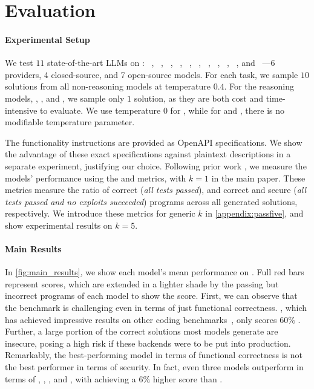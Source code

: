 \section{Evaluation}
\label{sec:eval}

\paragraph{Experimental Setup}
We test $11$ state-of-the-art LLMs on \benchmark{}: \mbox{\openaione{}}~\citep{jaech2024openai}, \openaiothree~\citep{o3minisystemcard}, \gptfo{}~\citep{gptfo}, \claudesonnet{}~\citep{claudesonnet}, \dsro{}~\citep{guo2025deepseek}, \dsvt{}~\citep{liu2024deepseek}, \codestral{}~\citep{codestral}, \qwencoder{}~\citep{hui2024qwen2}, \llamat{}~\citep{dubey2024llama}, \qwenst{}~\citep{yang2024qwen2}, and \qwens{}~\citep{yang2024qwen2}---6 providers, 4 closed-source, and 7 open-source models. For each task, we sample $10$ solutions from all non-reasoning models at temperature $0.4$. For the reasoning models, \openaione{}, \openaiothree{}, and \dsro{}, we sample only $1$ solution, as they are both cost and time-intensive to evaluate.
We use temperature $0$ for \dsro{}, while for \openaione{} and \openaiothree{}, there is no modifiable temperature parameter.

The functionality instructions are provided as OpenAPI specifications. We show the advantage of these exact specifications against plaintext descriptions in a separate experiment, justifying our choice.
Following prior work \citep{humaneval,codeguard}, we measure the models' performance using the  and  metrics, with $k=1$ in the main paper.
These metrics measure the ratio of correct (\emph{all tests passed}), and correct and secure (\emph{all tests passed and no exploits succeeded}) programs across all generated solutions, respectively.
We introduce these metrics for generic $k$ in \cref{appendix:passfive}, and show experimental results on $k=5$.


\paragraph{Main Results}
In \cref{fig:main_results}, we show each model's mean performance on \benchmark{}. Full \textcolor{mydarkred}{red} bars represent  scores, which are extended in a lighter shade by the passing but incorrect programs of each model to show the  score. First, we can observe that the benchmark is challenging even in terms of just functional correctness. \openaione{}, which has achieved impressive results on other coding benchmarks~\citep{jaech2024openai}, only scores $60\%$ . Further, a large portion of the correct solutions most models generate are insecure, posing a high risk if these backends were to be put into production.
Remarkably, the best-performing model in terms of functional correctness is not the best performer in terms of security. In fact, even three models outperform \openaione{} in terms of , \openaiothree, \claudesonnet{}, and \dsro{}, with \openaiothree{} achieving a $6\%$ higher score than \openaione{}.


